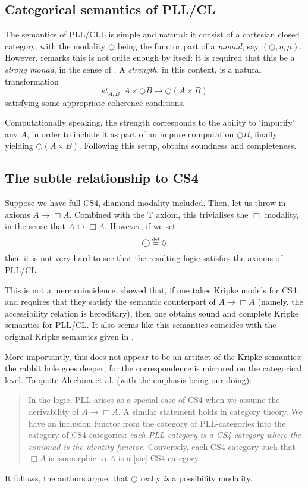 \documentclass[a4paper]{amsart}
\newcommand{\myeq}{\stackrel{\mathclap{\tiny\mbox{def}}}{=}}
\begin{document}
\subsection{Categorical semantics of \textsf{PLL/CL}}

The semantics of \textsf{PLL/CLL} is simple and natural: it
consist of a cartesian closed category, with the modality
$\bigcirc$ being the functor part of a \emph{monad}, say
$(\bigcirc, \eta, \mu)$. However, \cite{Moggi1989} remarks this is
not quite enough by itself: it is required that this be a
\emph{strong monad}, in the sense of \cite{Kock1972}. A
\emph{strength}, in this context, is a natural transformation \[
  st_{A, B} : A \times \bigcirc B \rightarrow \bigcirc (A \times B)
\] satisfying some appropriate coherence conditions.

Computationally speaking, the strength corresponds to the ability
to `impurify' any $A$, in order to include it as part of an impure
computation $\bigcirc B$, finally yielding $\bigcirc (A \times
B)$.  Following this setup, \cite{Moggi1989, Moggi1991} obtains
soundness and completeness.

\subsection{The subtle relationship to \textsf{CS4}}

Suppose we have full \textsf{CS4}, diamond modality included.
Then, let us throw in axioms $A \rightarrow \Box A$. Combined with
the \textsf{T} axiom, this trivialises the $\Box$ modality, in the
sense that $A \leftrightarrow \Box A$. However, if we set \[
  \bigcirc \myeq \lozenge
\] then it is not very hard to see that the resulting logic
satisfies the axioms of \textsf{PLL/CL}. 

This is not a mere coincidence. \cite{Alechina2001} showed that,
if one takes Kripke models for \textsf{CS4}, and requires that
they satisfy the semantic counterpart of $A \rightarrow \Box A$
(namely, the accessibility relation is hereditary), then one
obtains sound and complete Kripke semantics for \textsf{PLL/CL}.
It also seems like this semantics coincides with the original
Kripke semantics given in \cite{Fairtlough1997}.

More importantly, this does not appear to be an artifact of the
Kripke semantics: the rabbit hole goes deeper, for the
correspondence is mirrored on the categorical level. To quote
Alechina et al. (with the emphasis being our doing): \begin{quote}
  In the logic, \textsf{PLL} arises as a special case of
  \textsf{CS4} when we assume the derivability of $A \rightarrow
  \Box A$. A similar statement holds in category theory. We have
  an inclusion functor from the category of
  \textsf{PLL}-categories into the category of
  \textsf{CS4}-categories: \emph{each \textsf{PLL}-category is a
  \textsf{CS4}-category where the comonad is the identity
  functor.} Conversely, each \textsf{CS4}-category such that $\Box
  A$ is isomorphic to $A$ is a [sic] \textsf{CS4}-category.
\end{quote} It follows, the authors argue, that $\bigcirc$ really
\emph{is} a possibility modality.
\end{document}
